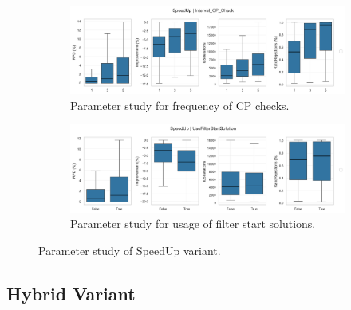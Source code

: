\begin{figure}[!ht]
	\centering
	\begin{subfigure}[t]{\textwidth}
		\centering
		\includegraphics[width=\linewidth]{pictures/parameter_study/Interval_CP_Check_SpeedUp_parameter_study.png}
		\caption{Parameter study for frequency of CP checks.}
	\end{subfigure}
	\begin{subfigure}[t]{\textwidth}
		\centering
		\includegraphics[width=\linewidth]{pictures/parameter_study/UseFilterStartSolution_SpeedUp_parameter_study.png}
		\caption{Parameter study for usage of filter start solutions.}
	\end{subfigure}
	\caption{Parameter study of SpeedUp variant.}
\end{figure}

\clearpage
\subsection{Hybrid Variant}
\label{app:subsec:parameterstudy_Hybrid}

